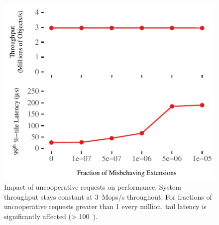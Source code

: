 \begin{figure}[t]
\centering
\includegraphics[width=1.0\columnwidth]{graphs/uncooperative.pdf}
\caption{Impact of uncooperative requests on performance. System
	throughput stays constant at 3~Mops/s throughout. For fractions
	of uncooperative requests greater than 1 every million, tail
	latency is significantly affected (> 100~\us).}
\label{fig:uncooperative}
\end{figure}
